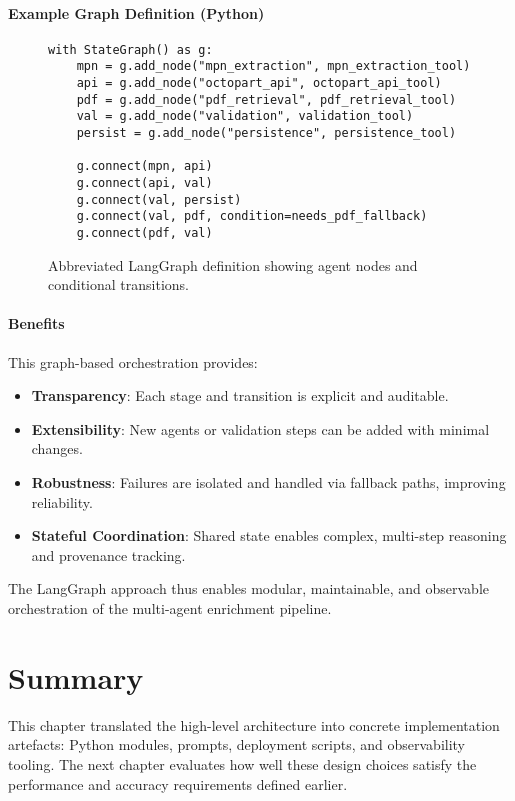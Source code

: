 \paragraph{Example Graph Definition (Python)}
\begin{figure}[H]
\centering
\begin{minipage}{0.95\textwidth}
\begin{verbatim}
with StateGraph() as g:
    mpn = g.add_node("mpn_extraction", mpn_extraction_tool)
    api = g.add_node("octopart_api", octopart_api_tool)
    pdf = g.add_node("pdf_retrieval", pdf_retrieval_tool)
    val = g.add_node("validation", validation_tool)
    persist = g.add_node("persistence", persistence_tool)

    g.connect(mpn, api)
    g.connect(api, val)
    g.connect(val, persist)
    g.connect(val, pdf, condition=needs_pdf_fallback)
    g.connect(pdf, val)
\end{verbatim}
\end{minipage}
\caption{Abbreviated LangGraph definition showing agent nodes and conditional transitions.}
\end{figure}

\paragraph{Benefits}
This graph-based orchestration provides:
\begin{itemize}
  \item \textbf{Transparency}: Each stage and transition is explicit and auditable.
  \item \textbf{Extensibility}: New agents or validation steps can be added with minimal changes.
  \item \textbf{Robustness}: Failures are isolated and handled via fallback paths, improving reliability.
  \item \textbf{Stateful Coordination}: Shared state enables complex, multi-step reasoning and provenance tracking.
\end{itemize}

The LangGraph approach thus enables modular, maintainable, and observable orchestration of the multi-agent enrichment pipeline.


\section{Summary}
This chapter translated the high-level architecture into concrete implementation artefacts: Python modules, prompts, deployment scripts, and observability tooling.  The next chapter evaluates how well these design choices satisfy the performance and accuracy requirements defined earlier.
